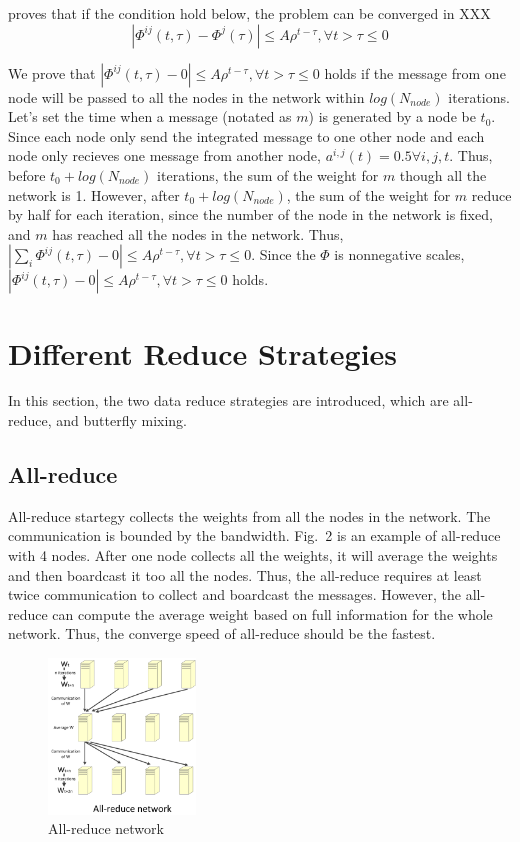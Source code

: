 \documentclass{article}
\begin{document}
\cite{parallelDistCom} proves that if the condition hold below, the problem can be converged in XXX\\
\[|\Phi^{ij}(t,\tau) - \Phi^j(\tau)|\leq A\rho^{t-\tau}, \forall t> \tau\leq0\]

We prove that $|\Phi^{ij}(t,\tau) - 0|\leq A\rho^{t-\tau}, \forall t> \tau\leq0$ holds if the message from one node will be passed to all the nodes in the network within $log(N_{node})$ iterations. Let's set the time when a message (notated as $m$) is generated by a node be $t_0$. Since each node only send the integrated message to one other node and each node only recieves one message from another node, $a^{i,j}(t) = 0.5 \forall i,j,t$. Thus, before $t_0 + log(N_{node})$ iterations, the sum of the weight for $m$ though all the network is 1. However, after $t_0 + log(N_{node})$, the sum of the weight for $m$ reduce by half for each iteration, since the number of the node in the network is fixed, and $m$ has reached all the nodes in the network. Thus, $|\sum_{i}\Phi^{ij}(t,\tau) - 0|\leq A\rho^{t-\tau}, \forall t> \tau\leq0$. Since the $\Phi$ is nonnegative scales, $|\Phi^{ij}(t,\tau) - 0|\leq A\rho^{t-\tau}, \forall t> \tau\leq0$ holds.   
\section{Different Reduce Strategies}
In this section, the two data reduce strategies are introduced, which are all-reduce, and butterfly mixing.

 \subsection{All-reduce}

All-reduce startegy collects the weights from all the nodes in the network. The communication is bounded by the bandwidth. Fig.~2 is an example of all-reduce with 4 nodes. After one node collects all the weights, it will average the weights and then boardcast it too all the nodes. Thus, the all-reduce requires at least twice communication to collect and boardcast the messages. However, the all-reduce can compute the average weight based on full information for the whole network. Thus, the converge speed of all-reduce should be the fastest.
\begin{figure}[h!]
  
  \centering
    \includegraphics[width=0.35\textwidth]{allreduce.jpg}
    \caption{All-reduce network}
\end{figure}
\end{document}
